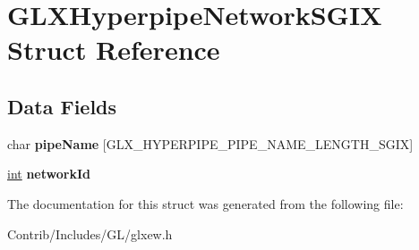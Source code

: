 \hypertarget{struct_g_l_x_hyperpipe_network_s_g_i_x}{}\section{G\+L\+X\+Hyperpipe\+Network\+S\+G\+IX Struct Reference}
\label{struct_g_l_x_hyperpipe_network_s_g_i_x}
\subsection*{Data Fields}
\begin{DoxyCompactItemize}
\item 
char {\bfseries pipe\+Name} \mbox{[}G\+L\+X\+\_\+\+H\+Y\+P\+E\+R\+P\+I\+P\+E\+\_\+\+P\+I\+P\+E\+\_\+\+N\+A\+M\+E\+\_\+\+L\+E\+N\+G\+T\+H\+\_\+\+S\+G\+IX\mbox{]}\hypertarget{struct_g_l_x_hyperpipe_network_s_g_i_x_accd4726a34638a32d105c6b9410837d3}{}\label{struct_g_l_x_hyperpipe_network_s_g_i_x_accd4726a34638a32d105c6b9410837d3}

\item 
\hyperlink{_s_d_l__thread_8h_a6a64f9be4433e4de6e2f2f548cf3c08e}{int} {\bfseries network\+Id}\hypertarget{struct_g_l_x_hyperpipe_network_s_g_i_x_ae310115398ac381a0cdf9c7caa87164b}{}\label{struct_g_l_x_hyperpipe_network_s_g_i_x_ae310115398ac381a0cdf9c7caa87164b}

\end{DoxyCompactItemize}


The documentation for this struct was generated from the following file\+:\begin{DoxyCompactItemize}
\item 
Contrib/\+Includes/\+G\+L/glxew.\+h\end{DoxyCompactItemize}
